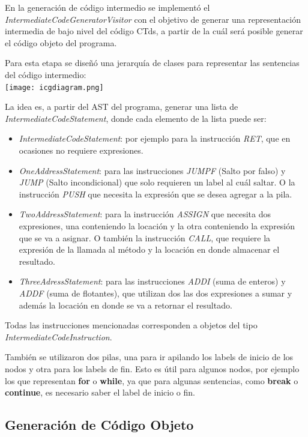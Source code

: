 \documentclass[11pt,a4paper]{article}
\begin{document}
En la generación de código intermedio se implementó el \textit{IntermediateCodeGeneratorVisitor} con el objetivo de generar una representación intermedia de bajo nivel del código CTds, a partir de la cuál será posible generar el código objeto del programa. 

Para esta etapa se diseñó una jerarquía de clases para representar las sentencias del código intermedio:
\\

\texttt{[image: icgdiagram.png]}

La idea es, a partir del AST del programa, generar una lista de  \textit{IntermediateCodeStatement}, donde cada elemento de la lista puede ser:
\begin{itemize}
\item \textit{IntermediateCodeStatement}: por ejemplo para la instrucción \textit{RET}, que en ocasiones no requiere expresiones.
\item \textit{OneAddressStatement}: para las instrucciones \textit{JUMPF} (Salto por falso) y \textit{JUMP} (Salto incondicional) que solo requieren un label al cuál saltar. O la instrucción \textit{PUSH} que necesita la expresión que se desea agregar a la pila. 
\item \textit{TwoAddressStatement}: para la instrucción \textit{ASSIGN} que necesita dos expresiones, una conteniendo la locación y la otra conteniendo la expresión que se va a asignar. O también la instrucción \textit{CALL}, que requiere la expresión de la llamada al método y la locación en donde almacenar el resultado.
\item \textit{ThreeAdressStatement}: para las instrucciones \textit{ADDI} (suma de enteros) y \textit{ADDF} (suma de flotantes), que utilizan dos las dos expresiones a sumar y además la locación en donde se va a retornar el resultado.
\end{itemize}

Todas las instrucciones mencionadas corresponden a objetos del tipo \textit{IntermediateCodeInstruction}.

También se utilizaron dos pilas, una para ir apilando los labels de inicio de los nodos y otra para los labels de fin. Esto es útil para algunos nodos, por ejemplo los que representan \textbf{for} o \textbf{while}, ya que para algunas sentencias, como \textbf{break} o \textbf{continue}, es necesario saber el label de inicio o fin. 

\subsection{Generación de Código Objeto} 
\label{subsec:genco}
\end{document}

